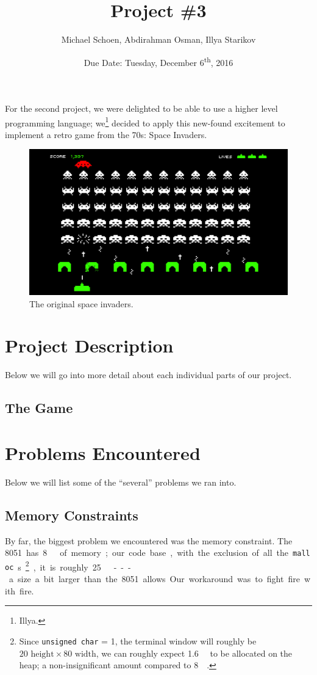 \documentclass[12pt]{article}
\title{Project \#3}
\date{Due Date: Tuesday, December 6\textsuperscript{th}, 2016}
\author{Michael Schoen, Abdirahman Osman, Illya Starikov}
\newcommand{\shellcmd}[1]{\texttt{\colorbox{gray!30}{#1}}}
\begin{document}
\maketitle

For the second project, we were delighted to be able to use a higher level programming language; we\footnote{Illya.} decided to apply this new-found excitement to implement a retro game from the \num{70}s: Space Invaders.

\begin{figure}[!ht]
    \includegraphics[width=\textwidth]{assets/space-invaders.jpg}
    \caption{The original space invaders.}
    \label{space-invaders}
\end{figure}

\section{Project Description}
Below we will go into more detail about each individual parts of our project.

\subsection{The Game}


\section{Problems Encountered}
Below we will list some of the ``several'' problems we ran into.

\subsection{Memory Constraints}
By far, the biggest problem we encountered was the memory constraint. The \SI{8051} has \SI{8}{\kilo\byte} of memory; our code base, with the exclusion of all the \shellcmd{malloc}s\footnote{Since \shellcmd{unsigned char} = \SI{1}{\byte}, the terminal window will roughly be $20\text{ height} \times 80\text{ width} $, we can roughly expect \SI{1.6}{\kilo\byte} to be allocated on the heap; a non-insignificant amount compared to \SI{8}{\kilo\byte}.}, it is roughly \SI{25}{\kilo\byte} --- a size a bit larger than the \num{8051} allows. Our workaround was to fight fire with fire.
\end{document}
